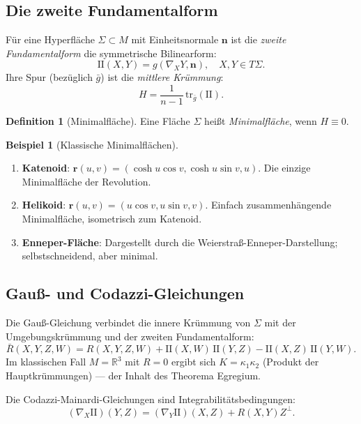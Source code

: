 \documentclass[12pt,a4paper]{amsart}
\theoremstyle{definition}
\newtheorem{definition}[theorem]{Definition}
\newtheorem{beispiel}[theorem]{Beispiel}
\begin{document}
\subsection{Die zweite Fundamentalform}

Für eine Hyperfläche $\Sigma \subset M$ mit Einheitsnormale $\mathbf{n}$
ist die \emph{zweite Fundamentalform} die symmetrische Bilinearform:
\[
  \mathrm{II}(X,Y) = g(\nabla_X Y, \mathbf{n}), \quad X, Y \in T\Sigma.
\]
Ihre Spur (bezüglich $\bar{g}$) ist die \emph{mittlere Krümmung}:
\[
  H = \frac{1}{n-1}\,\mathrm{tr}_{\bar{g}}(\mathrm{II}).
\]

\begin{definition}[Minimalfläche]
Eine Fläche $\Sigma$ heißt \emph{Minimalfläche}, wenn $H \equiv 0$.
\end{definition}

\begin{beispiel}[Klassische Minimalflächen]
\begin{enumerate}[label=(\alph*)]
  \item \textbf{Katenoid}: $\mathbf{r}(u,v) = (\cosh u \cos v, \cosh u \sin v, u)$.
        Die einzige Minimalfläche der Revolution.
  \item \textbf{Helikoid}: $\mathbf{r}(u,v) = (u\cos v, u\sin v, v)$.
        Einfach zusammenhängende Minimalfläche, isometrisch zum Katenoid.
  \item \textbf{Enneper-Fläche}: Dargestellt durch die Weierstraß-Enneper-Darstellung;
        selbstschneidend, aber minimal.
\end{enumerate}
\end{beispiel}

\subsection{Gauß- und Codazzi-Gleichungen}

Die Gauß-Gleichung verbindet die innere Krümmung von $\Sigma$ mit der Umgebungskrümmung
und der zweiten Fundamentalform:
\[
  \bar{R}(X,Y,Z,W) = R(X,Y,Z,W)
  + \mathrm{II}(X,W)\,\mathrm{II}(Y,Z) - \mathrm{II}(X,Z)\,\mathrm{II}(Y,W).
\]
Im klassischen Fall $M = \mathbb{R}^3$ mit $R = 0$ ergibt sich
$K = \kappa_1 \kappa_2$ (Produkt der Hauptkrümmungen) --- der Inhalt
des Theorema Egregium.

Die Codazzi-Mainardi-Gleichungen sind Integrabilitätsbedingungen:
\[
  (\nabla_X \mathrm{II})(Y,Z) = (\nabla_Y \mathrm{II})(X,Z) + R(X,Y)Z^{\perp}.
\]

\end{document}
